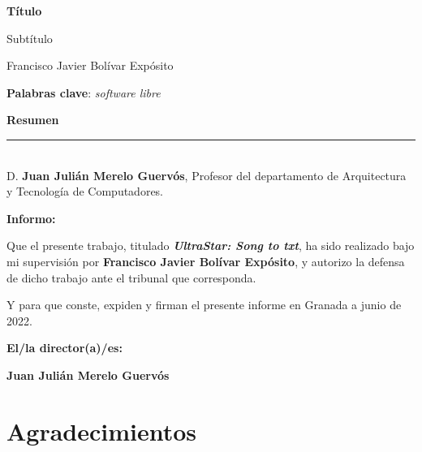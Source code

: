 \thispagestyle{empty}

\begin{center}
\large\bfseries
Título

Subtítulo 
\end{center}
\begin{center}
Francisco Javier Bolívar Expósito
\end{center}


\vspace{0.5cm}
\noindent\textbf{Palabras clave}: \textit{software libre}
\vspace{0.7cm}

\noindent\textbf{Resumen}
	

\cleardoublepage



\cleardoublepage

\thispagestyle{empty}

\noindent\rule[-1ex]{\textwidth}{2pt}\\[4.5ex]

D. \textbf{Juan Julián Merelo Guervós}, Profesor del departamento de Arquitectura y Tecnología de Computadores.

\vspace{0.5cm}

\textbf{Informo:}

\vspace{0.5cm}

Que el presente trabajo, titulado \textit{\textbf{UltraStar: Song to txt}},
ha sido realizado bajo mi supervisión por \textbf{Francisco Javier Bolívar Expósito}, y autorizo la defensa de dicho trabajo ante el tribunal
que corresponda.

\vspace{0.5cm}

Y para que conste, expiden y firman el presente informe en Granada a junio de 2022.

\vspace{1cm}

\textbf{El/la director(a)/es: }

\vspace{5cm}

\noindent \textbf{Juan Julián Merelo Guervós}

\chapter*{Agradecimientos}




